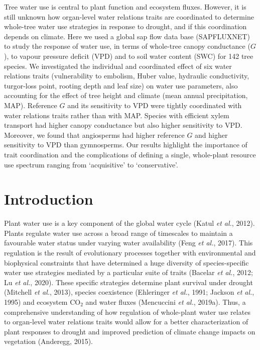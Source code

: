 \documentclass[11pt,twoside]{reedthesis}
\begin{document}
Tree water use is central to plant function and ecosystem fluxes.
However, it is still unknown how organ-level water relations traits are
coordinated to determine whole-tree water use strategies in response to
drought, and if this coordination depends on climate. Here we used a
global sap flow data base (SAPFLUXNET) to study the response of water
use, in terms of whole-tree canopy conductance (\(G\)), to vapour
pressure deficit (VPD) and to soil water content (SWC) for 142 tree
species. We investigated the individual and coordinated effect of six
water relations traits (vulnerability to embolism, Huber value,
hydraulic conductivity, turgor-loss point, rooting depth and leaf size)
on water use parameters, also accounting for the effect of tree height
and climate (mean annual precipitation, MAP). Reference \(G\) and its
sensitivity to VPD were tightly coordinated with water relations traits
rather than with MAP. Species with efficient xylem transport had higher
canopy conductance but also higher sensitivity to VPD. Moreover, we
found that angiosperms had higher reference \(G\) and higher sensitivity
to VPD than gymnosperms. Our results highlight the importance of trait
coordination and the complications of defining a single, whole-plant
resource use spectrum ranging from `acquisitive' to `conservative'.\par
\newpage

\section{Introduction}\label{introduction}

Plant water use is a key component of the global water cycle (Katul
\emph{et al.}, 2012). Plants regulate water use across a broad range of
timescales to maintain a favourable water status under varying water
availability (Feng \emph{et al.}, 2017). This regulation is the result
of evolutionary processes together with environmental and biophysical
constraints that have determined a huge diversity of species-specific
water use strategies mediated by a particular suite of traits (Bacelar
\emph{et al.}, 2012; Lu \emph{et al.}, 2020). These specific strategies
determine plant survival under drought (Mitchell \emph{et al.}, 2013),
species coexistence (Ehleringer \emph{et al.}, 1991; Jackson \emph{et
al.}, 1995) and ecosystem \(\text{CO}_2\) and water fluxes (Mencuccini
\emph{et al.}, 2019a). Thus, a comprehensive understanding of how
regulation of whole-plant water use relates to organ-level water
relations traits would allow for a better characterization of plant
responses to drought and improved prediction of climate change impacts
on vegetation (Anderegg, 2015).\par
\end{document}
